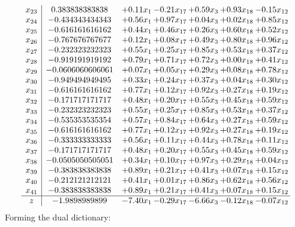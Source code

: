 \documentclass[8pt]{article}
\begin{document}
\[\begin{array}{c| c c@{\hskip 2pt} c@{\hskip 2pt} c@{\hskip 2pt} c@{\hskip 2pt} c@{\hskip 2pt} }
 x_{23}   &  0.383838383838 & +  0.11 x_{1} & -0.21 x_{17} & +  0.59 x_{3} & +  0.93 x_{18} & -0.15 x_{12}\\
 x_{24}   &  -0.434343434343 & +  0.56 x_{1} & +  0.97 x_{17} & +  0.04 x_{3} & +  0.02 x_{18} & +  0.85 x_{12}\\
 x_{25}   &  -0.616161616162 & +  0.44 x_{1} & +  0.46 x_{17} & +  0.26 x_{3} & +  0.60 x_{18} & +  0.52 x_{12}\\
 x_{26}   &  -0.767676767677 & +  0.12 x_{1} & +  0.08 x_{17} & +  0.49 x_{3} & +  0.80 x_{18} & +  0.96 x_{12}\\
 x_{27}   &  -0.232323232323 & +  0.55 x_{1} & +  0.25 x_{17} & +  0.85 x_{3} & +  0.53 x_{18} & +  0.37 x_{12}\\
 x_{28}   &  -0.919191919192 & +  0.79 x_{1} & +  0.71 x_{17} & +  0.72 x_{3} & +  0.00 x_{18} & +  0.41 x_{12}\\
 x_{29}   &  -0.0606060606061 & +  0.07 x_{1} & +  0.05 x_{17} & +  0.29 x_{3} & +  0.08 x_{18} & +  0.78 x_{12}\\
 x_{30}   &  -0.949494949495 & +  0.33 x_{1} & +  0.24 x_{17} & +  0.37 x_{3} & +  0.04 x_{18} & +  0.30 x_{12}\\
 x_{31}   &  -0.616161616162 & +  0.77 x_{1} & +  0.12 x_{17} & +  0.92 x_{3} & +  0.27 x_{18} & +  0.19 x_{12}\\
 x_{32}   &  -0.171717171717 & +  0.48 x_{1} & +  0.20 x_{17} & +  0.55 x_{3} & +  0.45 x_{18} & +  0.59 x_{12}\\
 x_{33}   &  -0.232323232323 & +  0.55 x_{1} & +  0.25 x_{17} & +  0.85 x_{3} & +  0.53 x_{18} & +  0.37 x_{12}\\
 x_{34}   &  -0.535353535354 & +  0.57 x_{1} & +  0.84 x_{17} & +  0.64 x_{3} & +  0.27 x_{18} & +  0.59 x_{12}\\
 x_{35}   &  -0.616161616162 & +  0.77 x_{1} & +  0.12 x_{17} & +  0.92 x_{3} & +  0.27 x_{18} & +  0.19 x_{12}\\
 x_{36}   &  -0.333333333333 & +  0.56 x_{1} & +  0.11 x_{17} & +  0.44 x_{3} & +  0.78 x_{18} & +  0.11 x_{12}\\
 x_{37}   &  -0.171717171717 & +  0.48 x_{1} & +  0.20 x_{17} & +  0.55 x_{3} & +  0.45 x_{18} & +  0.59 x_{12}\\
 x_{38}   &  -0.0505050505051 & +  0.34 x_{1} & +  0.10 x_{17} & +  0.97 x_{3} & +  0.29 x_{18} & +  0.04 x_{12}\\
 x_{39}   &  -0.383838383838 & +  0.89 x_{1} & +  0.21 x_{17} & +  0.41 x_{3} & +  0.07 x_{18} & +  0.15 x_{12}\\
 x_{40}   &  -0.212121212121 & +  0.41 x_{1} & +  0.01 x_{17} & +  0.86 x_{3} & +  0.62 x_{18} & +  0.56 x_{12}\\
 x_{41}   &  -0.383838383838 & +  0.89 x_{1} & +  0.21 x_{17} & +  0.41 x_{3} & +  0.07 x_{18} & +  0.15 x_{12}\\
\hline
z    &  -1.9898989899 & -7.40 x_{1} & -0.29 x_{17} & -6.66 x_{3} & -0.12 x_{18} & -0.07 x_{12}\\
\end{array}\]
Forming the dual dictionary:
\end{document}
